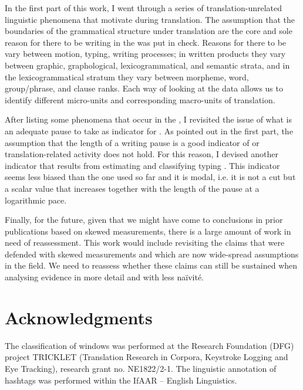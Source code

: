 \documentclass[output=paper]{LSP/langsci}
\begin{document}
In the first part of this work, I went through a series of translation-unrelated linguistic phenomena that motivate  during translation. The assumption that the boundaries of the grammatical structure under translation are the core and sole reason for there to be writing  in the  was put in check. Reasons for there to be  vary between motion, typing, writing processes; in written products they vary between graphic, graphological, lexicogrammatical, and semantic strata, and in the lexicogrammatical stratum they vary between morpheme, word, group/phrase, and clause ranks. Each way of looking at the data allows us to identify different micro-units and corresponding macro-units of translation.

After listing some phenomena that occur in the , I revisited the issue of what is an adequate pause to take as indicator for . As pointed out in the first part, the assumption that the length of a writing pause is a good indicator of  or translation-related activity does not hold. For this reason, I devised another indicator that results from estimating and classifying typing . This indicator seems less biased than the one used so far and it is modal, i.e. it is not a cut but a scalar value that increases together with the length of the pause at a logarithmic pace. 

Finally, for the future, given that we might have come to conclusions in prior publications based on skewed measurements, there is a large amount of work in need of reassessment. This work would include revisiting the claims that were defended with skewed measurements and which are now wide-spread assumptions in the field. We need to reassess whether these claims can still be sustained when analysing evidence in more detail and with less naïvité.

\section*{Acknowledgments}

The classification of  windows was performed at the  Research Foundation (DFG) project TRICKLET (Translation Research in Corpora, Keystroke Logging and Eye Tracking), research grant no. NE1822/2-1. The linguistic annotation of hashtags was performed within the IfAAR -- English Linguistics.


\sloppy
\printbibliography[heading=subbibliography,notkeyword=this]
\end{document}
